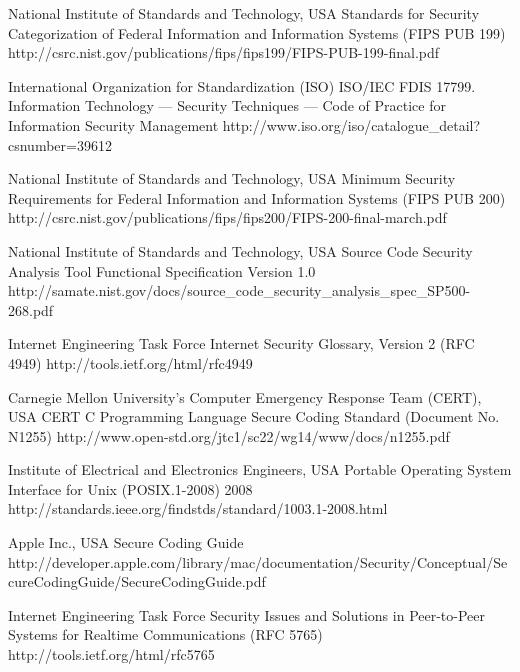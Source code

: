 \begin{thebibliography}{9}
		{National Institute of Standards and Technology, USA}
		{Standards for Security Categorization of Federal Information and Information Systems ({FIPS PUB} 199)}
		{}
		{http://csrc.nist.gov/publications/fips/fips199/FIPS-PUB-199-final.pdf}
		
		{International Organization for Standardization (ISO)}
		{ISO/IEC FDIS 17799. Information Technology — Security Techniques — Code of Practice for Information Security Management}
		{}
		{http://www.iso.org/iso/catalogue_detail?csnumber=39612}
	
		{National Institute of Standards and Technology, USA}
		{Minimum Security Requirements for Federal Information and Information Systems ({FIPS PUB} 200)}
		{}
		{http://csrc.nist.gov/publications/fips/fips200/FIPS-200-final-march.pdf}

		{National Institute of Standards and Technology, USA}
		{Source Code Security Analysis Tool Functional Specification Version 1.0}
		{}
		{http://samate.nist.gov/docs/source_code_security_analysis_spec_SP500-268.pdf}
	
		{Internet Engineering Task Force}
		{Internet Security Glossary, Version 2 ({RFC} 4949)}
		{}
		{http://tools.ietf.org/html/rfc4949}
	
		{Carnegie Mellon University's Computer Emergency Response Team (CERT), USA}
		{{CERT} {C} Programming Language Secure Coding Standard (Document No. N1255)}
		{}
		{http://www.open-std.org/jtc1/sc22/wg14/www/docs/n1255.pdf}
		
		{Institute of Electrical and Electronics Engineers, USA}
		{Portable Operating System Interface for {U}nix ({POSIX}.1-2008)}
		{2008}
		{http://standards.ieee.org/findstds/standard/1003.1-2008.html}
		
		{Apple Inc., USA}
		{Secure Coding Guide}
		{}
		{http://developer.apple.com/library/mac/documentation/Security/Conceptual/SecureCodingGuide/SecureCodingGuide.pdf}

		{Internet Engineering Task Force}
		{Security Issues and Solutions in Peer-to-Peer Systems for Realtime Communications ({RFC} 5765)}
		{}
		{http://tools.ietf.org/html/rfc5765}


\end{thebibliography}
